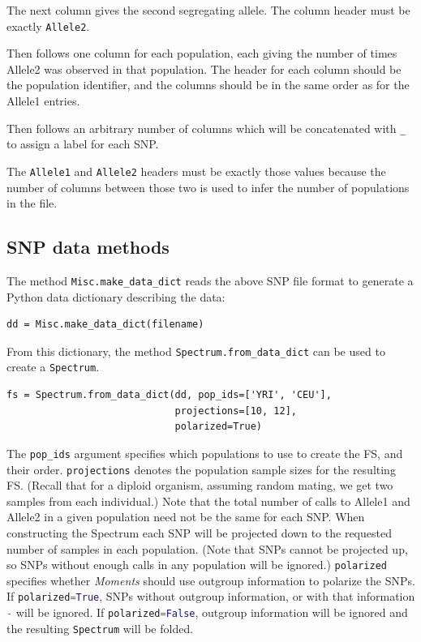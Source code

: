 \documentclass[12pt]{article}
\makeatletter
\newcommand{\py}[1]{\lstinline[language=Python, showstringspaces=False]@#1@}
\makeatother
\begin{document}
The next column gives the second segregating allele.
The column header must be exactly \py{Allele2}.

Then follows one column for each population, each giving the number of times Allele2 was observed in that population.
The header for each column should be the population identifier, and the columns should be in the same order as for the Allele1 entries.

Then follows an arbitrary number of columns which will be concatenated with \py{_} to assign a label for each SNP.

The \py{Allele1} and \py{Allele2} headers must be exactly those values because the number of columns between those two is used to infer the number of populations in the file.

\subsection{SNP data methods}

The method \py{Misc.make_data_dict} reads the above SNP file format to generate a Python data dictionary describing the data:
\begin{lstlisting}
dd = Misc.make_data_dict(filename)
\end{lstlisting}
From this dictionary, the method \py{Spectrum.from_data_dict} can be used to create a \py{Spectrum}.
\begin{lstlisting}
fs = Spectrum.from_data_dict(dd, pop_ids=['YRI', 'CEU'],
                             projections=[10, 12],
                             polarized=True)
\end{lstlisting}
The \py{pop_ids} argument specifies which populations to use to create the FS, and their order.
\py{projections} denotes the population sample sizes for the resulting FS.
(Recall that for a diploid organism, assuming random mating, we get two samples from each individual.)
Note that the total number of calls to Allele1 and Allele2 in a given population need not be the same for each SNP.
When constructing the Spectrum each SNP will be projected down to the requested number of samples in each population.
(Note that SNPs cannot be projected up, so SNPs without enough calls in any population will be ignored.)
\py{polarized} specifies whether \textit{Moments} should use outgroup information to polarize the SNPs.
If \py{polarized=True}, SNPs without outgroup information, or with that information \py{-} will be ignored.
If \py{polarized=False}, outgroup information will be ignored and the resulting \py{Spectrum} will be folded.
\end{document}
